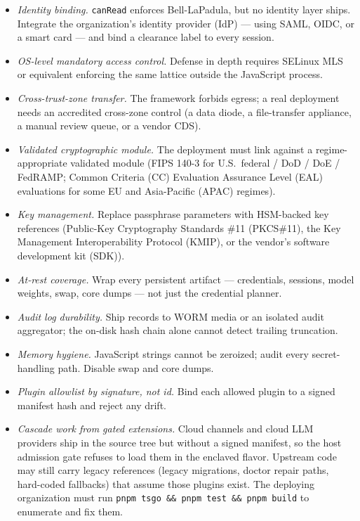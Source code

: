 \documentclass[11pt]{article}
\begin{document}
\begin{itemize}
  \item \emph{Identity binding.} \texttt{canRead} enforces
    Bell-LaPadula, but no identity layer ships. Integrate the
    organization's identity provider (IdP) --- using SAML, OIDC, or a
    smart card --- and bind a clearance label to every session.
  \item \emph{OS-level mandatory access control.} Defense in depth
    requires SELinux MLS or equivalent enforcing the same lattice
    outside the JavaScript process.
  \item \emph{Cross-trust-zone transfer.} The framework forbids egress;
    a real deployment needs an accredited cross-zone control (a data
    diode, a file-transfer appliance, a manual review queue, or a
    vendor CDS).
  \item \emph{Validated cryptographic module.} The deployment must link
    against a regime-appropriate validated module (FIPS 140-3 for U.S.\
    federal / DoD / DoE / FedRAMP; Common Criteria (CC) Evaluation
    Assurance Level (EAL) evaluations for some EU and Asia-Pacific
    (APAC) regimes).
  \item \emph{Key management.} Replace passphrase parameters with
    HSM-backed key references (Public-Key Cryptography Standards \#11
    (PKCS\#11), the Key Management Interoperability Protocol (KMIP),
    or the vendor's software development kit (SDK)).
  \item \emph{At-rest coverage.} Wrap every persistent artifact ---
    credentials, sessions, model weights, swap, core dumps --- not just
    the credential planner.
  \item \emph{Audit log durability.} Ship records to WORM media or an
    isolated audit aggregator; the on-disk hash chain alone cannot
    detect trailing truncation.
  \item \emph{Memory hygiene.} JavaScript strings cannot be zeroized;
    audit every secret-handling path. Disable swap and core dumps.
  \item \emph{Plugin allowlist by signature, not id.} Bind each allowed
    plugin to a signed manifest hash and reject any drift.
  \item \emph{Cascade work from gated extensions.} Cloud channels and
    cloud LLM providers ship in the source tree but without a signed
    manifest, so the host admission gate refuses to load them in the
    enclaved flavor. Upstream code may still carry legacy references
    (legacy migrations, doctor repair paths, hard-coded fallbacks) that
    assume those plugins exist. The deploying organization must run
    \texttt{pnpm tsgo \&\& pnpm test \&\& pnpm build} to enumerate and
    fix them.
\end{itemize}
\end{document}
